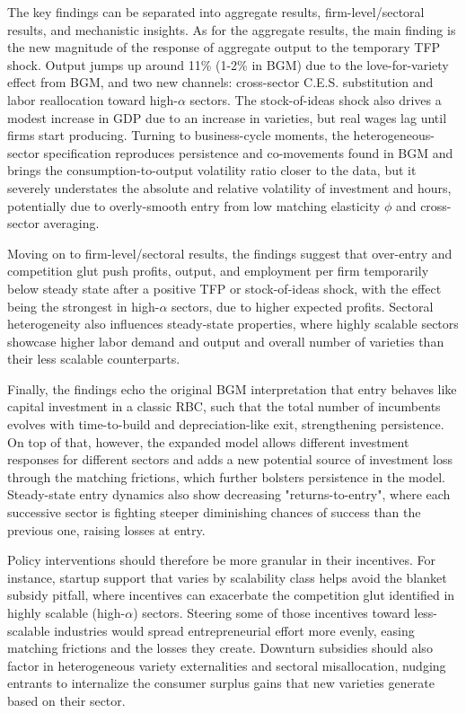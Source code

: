 \documentclass[a4paper,12pt]{article} %
\numberwithin{equation}{section} %
\numberwithin{figure}{section}
\numberwithin{table}{section}
\begin{document}
The key findings can be separated into aggregate results, firm-level/sectoral results, and mechanistic insights. As for the aggregate results,
the main finding is the new magnitude of the response of aggregate output to the temporary TFP shock. Output jumps up around 11\%  (1-2\% in BGM) due to 
the love-for-variety effect from BGM, and two new channels: cross-sector C.E.S. substitution and labor reallocation toward high-$\alpha$ sectors.
The stock-of-ideas shock also drives a modest increase in GDP due to an increase in varieties, but real wages lag until firms start producing.
Turning to business-cycle moments, the heterogeneous-sector specification reproduces persistence and co-movements found in BGM and brings the 
consumption-to-output volatility ratio closer to the data, but it severely understates the absolute and relative volatility of investment and hours, potentially
due to overly-smooth entry from low matching elasticity $\phi$ and cross-sector averaging.

Moving on to firm-level/sectoral results, the findings suggest that over-entry and competition glut push profits, output, and employment per firm 
temporarily below steady state after a positive TFP or stock-of-ideas shock, with the effect being the strongest in high-$\alpha$ sectors, due to higher
expected profits. Sectoral heterogeneity also influences steady-state properties, where highly scalable sectors showcase higher labor demand and output 
and overall number of varieties than their less scalable counterparts.

Finally, the findings echo the original BGM interpretation that entry behaves like capital investment in a classic RBC, such that the total number of
incumbents evolves with time-to-build and depreciation-like exit, strengthening persistence. On top of that, however, the expanded model allows 
different investment responses for different sectors and adds a new potential source of investment loss through the matching frictions, 
which further bolsters persistence in the model. Steady-state entry dynamics also show decreasing "returns-to-entry", where each successive sector is 
fighting steeper diminishing chances of success than the previous one, raising losses at entry.

Policy interventions should therefore be more granular in their incentives. For instance, startup support that varies by scalability class helps avoid 
the blanket subsidy pitfall, where incentives can exacerbate the competition glut identified in highly scalable (high-$\alpha$) sectors. 
Steering some of those incentives toward less-scalable industries would spread entrepreneurial effort more evenly, easing matching 
frictions and the losses they create. Downturn subsidies should also factor in heterogeneous variety externalities and sectoral misallocation, 
nudging entrants to internalize the consumer surplus gains that new varieties generate based on their sector.
\end{document}
